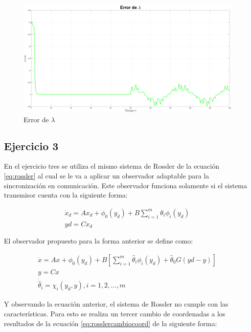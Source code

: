 \begin{figure}[H]
	\centering
	\includegraphics[width=150mm]{img/E2_ErrorLambda.png}
	\caption{Error de $\lambda$}
	\label{img:rossler4}
\end{figure}

\subsection*{Ejercicio 3}

En el ejercicio tres se utiliza el mismo sistema de Rossler de la ecuación \ref{eq:rossler} al cual se le va a aplicar un observador adaptable para la sincronización en comunicación. Este observador funciona solamente si el sistema transmisor cuenta con la siguiente forma:

\begin{equation}\label{eq:formalureadap}
	\begin{array}{l}
		\dot{x}_d = Ax_d + \phi_0(y_d) + B \sum_{i=1}^{m} \theta_i \phi_i(y_d)\\
		yd = Cx_d
	\end{array}
\end{equation}

El observador propuesto para la forma anterior se define como:

\begin{equation}\label{eq:obsadap}
	\begin{array}{l}
		\dot{x} = Ax + \phi_0(y_d) + B \left[ \sum_{i=1}^{m} \hat{\theta}_i \phi_i(y_d) + \hat{\theta}_0 G(yd - y) \right]\\
		y = Cx\\
		\dot{\hat{\theta}}_i = \chi_i(y_d,y), i = 1,2,\dots,m
	\end{array}
\end{equation}

Y observando la ecuación anterior, el sistema de Rossler no cumple con las características. Para esto se realiza un tercer cambio de coordenadas a los resultados de la ecuación \ref{eq:rosslercambiocoord} de la siguiente forma:

